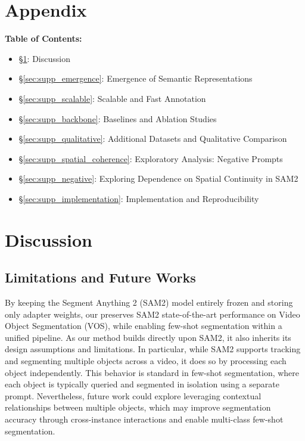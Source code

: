 \clearpage 
\appendix
\section*{Appendix}


\textbf{Table of Contents:}
\begin{itemize}
    \item \S \ref{sec:supp_discussion}: Discussion
    \item §\ref{sec:supp_emergence}: Emergence of Semantic Representations
    \item §\ref{sec:supp_scalable}: Scalable and Fast Annotation
    \item §\ref{sec:supp_backbone}: Baselines and Ablation Studies
    \item §\ref{sec:supp_qualitative}: Additional Datasets and Qualitative Comparison
    \item §\ref{sec:supp_spatial_coherence}: Exploratory Analysis: Negative Prompts
    \item §\ref{sec:supp_negative}: Exploring Dependence on Spatial Continuity in SAM2
    \item §\ref{sec:supp_implementation}: Implementation and Reproducibility
\end{itemize}



\section{Discussion}
\label{sec:supp_discussion}
\subsection{Limitations and Future Works}
By keeping the Segment Anything 2 (SAM2) \cite{ravi2024sam} model entirely frozen and storing only adapter weights, our \ours{} preserves SAM2 state-of-the-art performance on Video Object Segmentation (VOS), while enabling few-shot segmentation within a unified pipeline.
As our method builds directly upon SAM2, it also inherits its design assumptions and limitations. In particular, while SAM2 supports tracking and segmenting multiple objects across a video, it does so by processing each object independently. This behavior is standard in few-shot segmentation, where each object is typically queried and segmented in isolation using a separate prompt. Nevertheless, future work could explore leveraging contextual relationships between multiple objects, which may improve segmentation accuracy through cross-instance interactions and enable multi-class few-shot segmentation.

